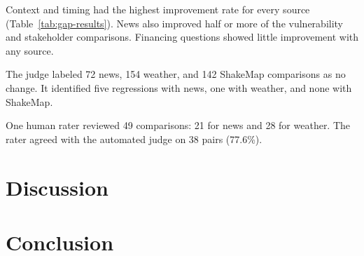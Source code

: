 \documentclass[journal]{IEEEtran}
\begin{document}
Context and timing had the highest improvement rate for every source (Table~\ref{tab:gap-results}).
News also improved half or more of the vulnerability and stakeholder comparisons.
Financing questions showed little improvement with any source.

The judge labeled 72 news, 154 weather, and 142 ShakeMap comparisons as no change.
It identified five regressions with news, one with weather, and none with ShakeMap.

One human rater reviewed 49 comparisons: 21 for news and 28 for weather.
The rater agreed with the automated judge on 38 pairs (77.6\%).

\section{Discussion}


\section{Conclusion}




\end{document}
